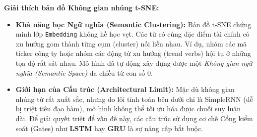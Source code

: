 \textbf{Giải thích bản đồ Không gian nhúng t-SNE:}
\begin{itemize}
    \item \textbf{Khả năng học Ngữ nghĩa (Semantic Clustering):} Bản đồ t-SNE chứng minh lớp \texttt{Embedding} không hề học vẹt. Các từ có cùng đặc điểm tài chính có xu hướng gom thành từng cụm (cluster) nối liền nhau. Ví dụ, nhóm các mã ticker công ty hoặc nhóm các động từ xu hướng (trend verbs) hội tụ ở những tọa độ rất sát nhau. Mô hình đã tự động xây dựng được một \textit{Không gian ngữ nghĩa (Semantic Space)} đa chiều từ con số 0.
    \item \textbf{Giới hạn của Cấu trúc (Architectural Limit):} Mặc dù không gian nhúng từ rất xuất sắc, nhưng do lõi tính toán bên dưới chỉ là SimpleRNN (dễ bị triệt tiêu đạo hàm), mô hình không thể tối ưu hóa được chuỗi suy luận dài. Để giải quyết triệt để vấn đề này, các cấu trúc sử dụng cơ chế Cổng kiểm soát (Gates) như \textbf{LSTM} hay \textbf{GRU} là sự nâng cấp bắt buộc.
\end{itemize}
